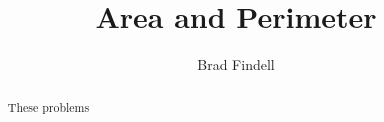 \documentclass[nooutcomes]{ximera}
\title{Area and Perimeter}
\author{Brad Findell}
\begin{document}
\begin{abstract}
These problems 
\end{abstract}
\maketitle
\end{document}
